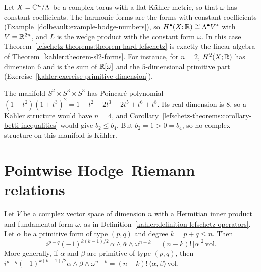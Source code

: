 \begin{example}\label{lefschetz-theorems:example-tori}
Let $X = \mathbb{C}^n/\Lambda$ be a complex torus with a flat K\"ahler metric, so that $\omega$ has constant coefficients. The harmonic forms are the
forms with constant coefficients (Example~\ref{dolbeault:example-hodge-numbers}), so $H^\bullet(X; \mathbb{R}) \cong \Lambda^\bullet V^*$ with
$V = \mathbb{R}^{2n}$, and $L$ is the wedge product with the constant form $\omega$. In this case
Theorem~\ref{lefschetz-theorems:theorem-hard-lefschetz} is exactly the linear algebra of Theorem~\ref{kahler:theorem-sl2-forms}. For
instance, for $n = 2$, $H^2(X; \mathbb{R})$ has dimension $6$ and is the sum of $\mathbb{R}[\omega]$ and the $5$-dimensional primitive part
(Exercise~\ref{kahler:exercise-primitive-dimension}).
\end{example}

\begin{example}\label{lefschetz-theorems:example-betti-obstruction}
The manifold $S^2 \times S^3 \times S^3$ has Poincar\'e polynomial $(1 + t^2)(1 + t^3)^2 = 1 + t^2 + 2t^3 + 2t^5 + t^6 + t^8$. Its real
dimension is $8$, so a K\"ahler structure would have $n = 4$, and Corollary~\ref{lefschetz-theorems:corollary-betti-inequalities} would
give $b_2 \leq b_4$. But $b_2 = 1 > 0 = b_4$, so no complex structure on this manifold is K\"ahler.
\end{example}

\section{Pointwise Hodge--Riemann relations}\label{lefschetz-theorems:section-pointwise}

\begin{proposition}\label{lefschetz-theorems:proposition-pointwise-hodge-riemann}
Let $V$ be a complex vector space of dimension $n$ with a Hermitian inner product and fundamental form $\omega$, as in
Definition~\ref{kahler:definition-lefschetz-operators}. Let $\alpha$ be a primitive form of type $(p,q)$ and degree $k = p + q \leq n$. Then
\[
i^{p-q}(-1)^{k(k-1)/2}\,\alpha \wedge \bar\alpha \wedge \omega^{n-k} = (n-k)!\,|\alpha|^2\,\mathrm{vol} .
\]
More generally, if $\alpha$ and $\beta$ are primitive of type $(p,q)$, then
$i^{p-q}(-1)^{k(k-1)/2}\alpha \wedge \bar\beta \wedge \omega^{n-k} = (n-k)!\,\langle\alpha, \beta\rangle\,\mathrm{vol}$.
\end{proposition}

